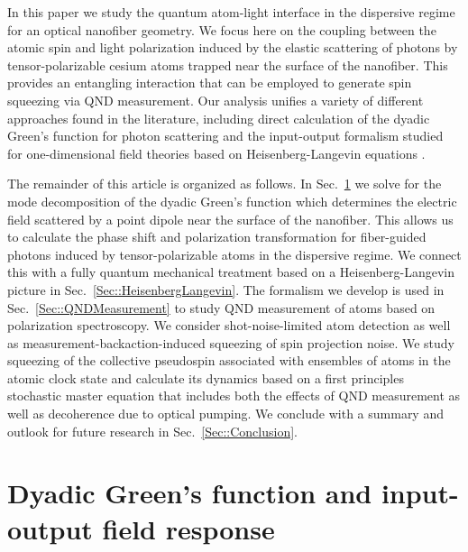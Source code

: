 \documentclass[preprint, aps,pra,onecolumn]{revtex4-1} %
\newcommand{\srf}[1]{Sec.~\ref{#1}}
\begin{document}
In this paper we study the quantum atom-light interface in the dispersive regime for an optical nanofiber geometry.  We focus here on the coupling between the atomic spin and light polarization induced by the elastic scattering of photons by tensor-polarizable cesium atoms trapped near the surface of the nanofiber.  This provides an entangling interaction that can be employed to generate spin squeezing via QND measurement.  Our analysis unifies a variety of different approaches found in the literature, including direct calculation of the dyadic Green's function for photon scattering \cite{sakoda_optical_1996, dung_spontaneous_2000, sondergaard_general_2001, klimov_spontaneous_2004, wubs_multiple-scattering_2004, fussell_decay_2005, manga_rao_single_2007, dzsotjan_quantum_2010} and the input-output formalism studied for one-dimensional field theories based on Heisenberg-Langevin equations \cite{gardiner_input_1985, blow_continuum_1990, shen_coherent_2005, le_kien_spontaneous_2005, le_kien_correlations_2008, fan_input-output_2010}.

The remainder of this article is organized as follows.  
In \srf{Sec::GreensFunction} we solve for the mode decomposition of the dyadic Green's function which determines the electric field scattered by a point dipole near the surface of the nanofiber.  
This allows us to calculate the phase shift and polarization transformation for fiber-guided photons induced by tensor-polarizable atoms in the dispersive regime.  
We connect this with a fully quantum mechanical treatment based on a Heisenberg-Langevin picture in \srf{Sec::HeisenbergLangevin}.  
The formalism we develop is used in \srf{Sec::QNDMeasurement} to study QND measurement of atoms based on polarization spectroscopy. 
We consider shot-noise-limited atom detection as well as measurement-backaction-induced squeezing of spin projection noise.  
We study squeezing of the collective pseudospin associated with ensembles of atoms in the atomic clock state and calculate its dynamics based on a first principles stochastic master equation that includes both the effects of QND measurement as well as decoherence due to optical pumping.  
We conclude with a summary and outlook for future research in \srf{Sec::Conclusion}.  


\section{Dyadic Green's function and input-output field response} \label{Sec::GreensFunction}
\end{document}
